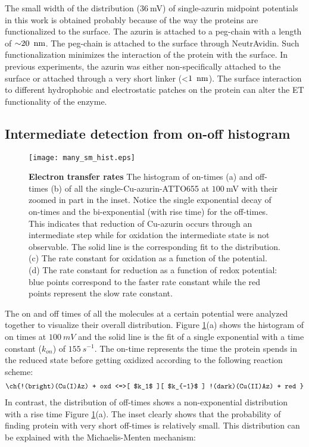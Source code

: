 The small width of the distribution ($36~$mV) of single-azurin midpoint potentials in this work is obtained probably because of the way the proteins are functionalized to the surface. The azurin is attached to a peg-chain with a length of ${\sim}20~\,\textrm{nm}$. The peg-chain is attached to the surface through NeutrAvidin. Such functionalization minimizes the interaction of the protein with the surface. In previous experiments, the azurin was either non-specifically attached to the surface or attached through a very short linker (<$1~\,\textrm{nm}$). The surface interaction to different hydrophobic and electrostatic patches on the protein can alter the ET functionality of the enzyme.
\subsection{Intermediate detection from on-off histogram}
\begin{figure}
	\centering
	\texttt{[image: many\_sm\_hist.eps]}
	\caption{\textbf{Electron transfer rates} The histogram of on-times (a) and off-times (b) of all the single-Cu-azurin-ATTO655 at $100~$mV with their zoomed in part in the inset. Notice the single exponential decay of on-times and the bi-exponential (with rise time) for the off-times. This indicates that  reduction of Cu-azurin occurs through an intermediate step while for oxidation the intermediate state is not observable. The solid line is the corresponding fit to the distribution. (c) The rate constant for oxidation as a function of the potential. (d) The rate constant for reduction as a function of redox potential: blue points correspond to the faster rate constant while the red points represent the slow rate constant.}
	\label{fig:many_sm_hist}
\end{figure}
The on and off times of all the molecules at a certain potential were analyzed together to visualize their overall distribution. Figure \ref{fig:many_sm_hist}(a) shows the histogram of on times at $100~mV$ and the solid line is the fit of a single exponential with a time constant ($k_{on}$) of $155~s^{-1}$. The on-time represents the time the protein spends in the reduced state before getting oxidized according to the following reaction scheme:
\begin{align}
	\ch{!(bright)(Cu(I)Az) + oxd <=>[ $k_1$ ][ $k_{-1}$ ] !(dark)(Cu(II)Az) + red }
	\label{eq:oxidation}
\end{align}
In contrast, the distribution of off-times shows a non-exponential distribution with a rise time Figure \ref{fig:many_sm_hist}(a). The inset clearly shows that the probability of finding protein with very short off-times is relatively small. This distribution can be explained with the Michaelis-Menten mechanism:
